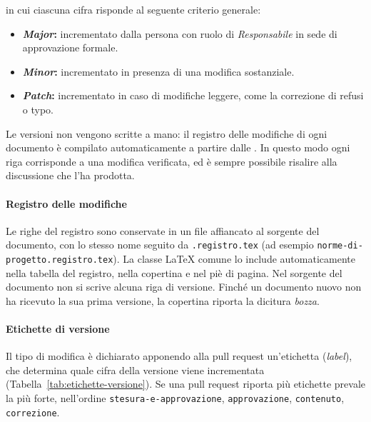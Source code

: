 \documentclass[documento]{gpt}
\begin{document}
	in cui ciascuna cifra risponde al seguente criterio generale:
	
	\begin{itemize}
		\item \textbf{\textit{Major}:} incrementato dalla persona con ruolo di \textit{Responsabile} in sede di approvazione formale.
		\item \textbf{\textit{Minor}:} incrementato in presenza di una modifica sostanziale.
		\item \textbf{\textit{Patch}:} incrementato in caso di modifiche leggere, come la correzione di refusi o typo.
	\end{itemize}
	
	Le versioni non vengono scritte a mano: il registro delle modifiche di ogni documento è compilato automaticamente a partire dalle . In questo modo ogni riga corrisponde a una modifica verificata, ed è sempre possibile risalire alla discussione che l'ha prodotta.
	
	\paragraph{Registro delle modifiche}
	Le righe del registro sono conservate in un file affiancato al sorgente del documento, con lo stesso nome seguito da \texttt{.registro.tex} (ad esempio \texttt{norme-di-progetto.registro.tex}). La classe \LaTeX{} comune lo include automaticamente nella tabella del registro, nella copertina e nel piè di pagina. Nel sorgente del documento non si scrive alcuna riga di versione. Finché un documento nuovo non ha ricevuto la sua prima versione, la copertina riporta la dicitura \textit{bozza}.
	
	\paragraph{Etichette di versione}
	Il tipo di modifica è dichiarato apponendo alla pull request un'etichetta (\textit{label}), che determina quale cifra della versione viene incrementata (Tabella~\ref{tab:etichette-versione}). Se una pull request riporta più etichette prevale la più forte, nell'ordine \texttt{stesura-e-approvazione}, \texttt{approvazione}, \texttt{contenuto}, \texttt{correzione}.
	
\end{document}
